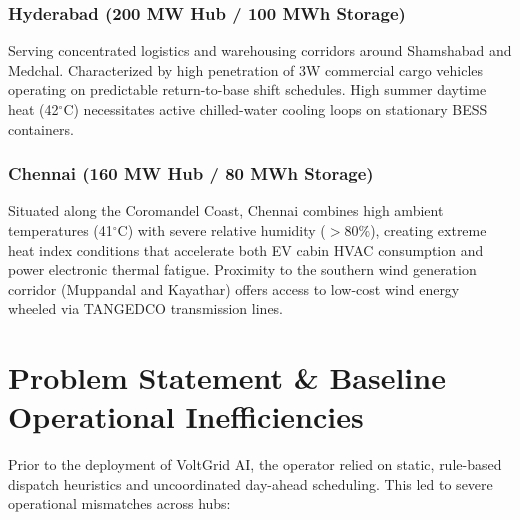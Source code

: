 \documentclass[10.5pt,a4paper]{article}
\begin{document}
\subsubsection{Hyderabad (200 MW Hub / 100 MWh Storage)}
Serving concentrated logistics and warehousing corridors around Shamshabad and Medchal. Characterized by high penetration of 3W commercial cargo vehicles operating on predictable return-to-base shift schedules. High summer daytime heat (42$^\circ$C) necessitates active chilled-water cooling loops on stationary BESS containers.

\subsubsection{Chennai (160 MW Hub / 80 MWh Storage)}
Situated along the Coromandel Coast, Chennai combines high ambient temperatures (41$^\circ$C) with severe relative humidity ($>80\%$), creating extreme heat index conditions that accelerate both EV cabin HVAC consumption and power electronic thermal fatigue. Proximity to the southern wind generation corridor (Muppandal and Kayathar) offers access to low-cost wind energy wheeled via TANGEDCO transmission lines.

\section{Problem Statement \& Baseline Operational Inefficiencies}

Prior to the deployment of VoltGrid AI, the operator relied on static, rule-based dispatch heuristics and uncoordinated day-ahead scheduling. This led to severe operational mismatches across hubs:
\end{document}
